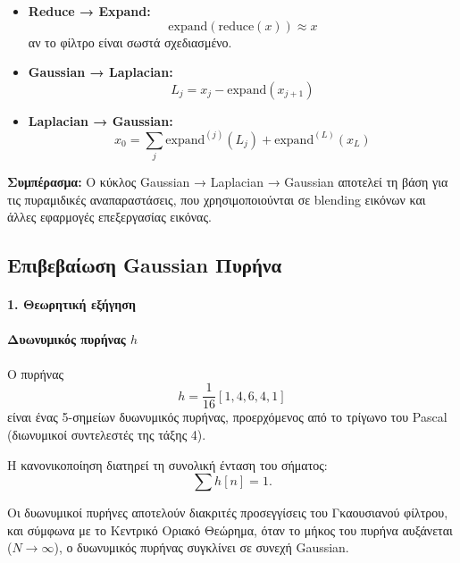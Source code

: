 \documentclass[12pt]{article}
\begin{document}
\begin{itemize}
    \item \textbf{Reduce → Expand:} 
    \begin{equation}
    \text{expand}(\text{reduce}(x)) \approx x
    \label{eq:reduce_expand}
    \end{equation}
    αν το φίλτρο είναι σωστά σχεδιασμένο.
    
    \item \textbf{Gaussian → Laplacian:} 
    \begin{equation}
    L_j = x_j - \text{expand}(x_{j+1})
    \label{eq:gaussian_laplacian}
    \end{equation}
    
    \item \textbf{Laplacian → Gaussian:} 
    \begin{equation}
    x_0 = \sum_j \text{expand}^{(j)}(L_j) + \text{expand}^{(L)}(x_L)
    \label{eq:laplacian_gaussian}
    \end{equation}
\end{itemize}

\textbf{Συμπέρασμα:} Ο κύκλος Gaussian → Laplacian → Gaussian αποτελεί τη βάση για τις πυραμιδικές αναπαραστάσεις, που χρησιμοποιούνται σε blending εικόνων και άλλες εφαρμογές επεξεργασίας εικόνας.

\subsection{Επιβεβαίωση Gaussian Πυρήνα}

\paragraph{1. Θεωρητική εξήγηση}
\paragraph{Δυωνυμικός πυρήνας $h$}

Ο πυρήνας
\[
h = \frac{1}{16}[1, 4, 6, 4, 1]
\]
είναι ένας 5-σημείων δυωνυμικός πυρήνας, προερχόμενος από το τρίγωνο του Pascal (διωνυμικοί συντελεστές της τάξης 4).  

Η κανονικοποίηση διατηρεί τη συνολική ένταση του σήματος:
\[
\sum h[n] = 1.
\]

Οι δυωνυμικοί πυρήνες αποτελούν διακριτές προσεγγίσεις του Γκαουσιανού φίλτρου, και σύμφωνα με το Κεντρικό Οριακό Θεώρημα, όταν το μήκος του πυρήνα αυξάνεται ($N \to \infty$), ο δυωνυμικός πυρήνας συγκλίνει σε συνεχή Gaussian.  
\end{document}
